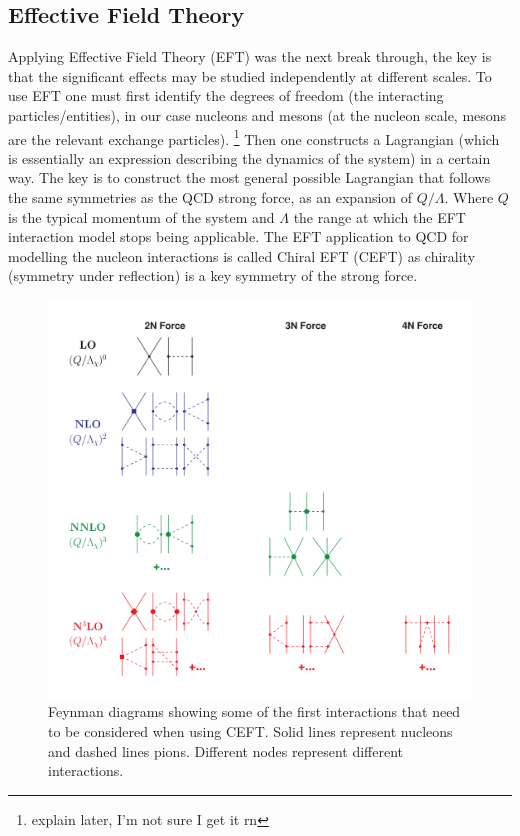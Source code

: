 \subsection{Effective Field Theory}
Applying Effective Field Theory (EFT) was the next break through, the key is that the significant effects may be studied independently at different scales.
To use EFT one must first identify the degrees of freedom (the interacting particles/entities), in our case nucleons and mesons (at the nucleon scale, mesons are the relevant exchange particles).
\footnote{explain later, I'm not sure I get it rn}
Then one constructs a Lagrangian (which is essentially an expression describing the dynamics of the system) in a certain way.
The key is to construct the most general possible Lagrangian that follows the same symmetries as the QCD strong force, as an expansion of $Q/\Lambda$.
Where $Q$ is the typical momentum of the system and $\Lambda$ the range at which the EFT interaction model stops being applicable.
The EFT application to QCD for modelling the nucleon interactions is called Chiral EFT (CEFT) as chirality (symmetry under reflection) is a key symmetry of the strong force.

\begin{figure}[H]
    \centering
    \includegraphics[width=.4\textwidth]{images/diagram.png}
    \caption{Feynman diagrams showing some of the first interactions that need to be considered when using CEFT. Solid lines represent nucleons and dashed lines pions. Different nodes represent different interactions.}\label{fig:diagram1}
\end{figure}

